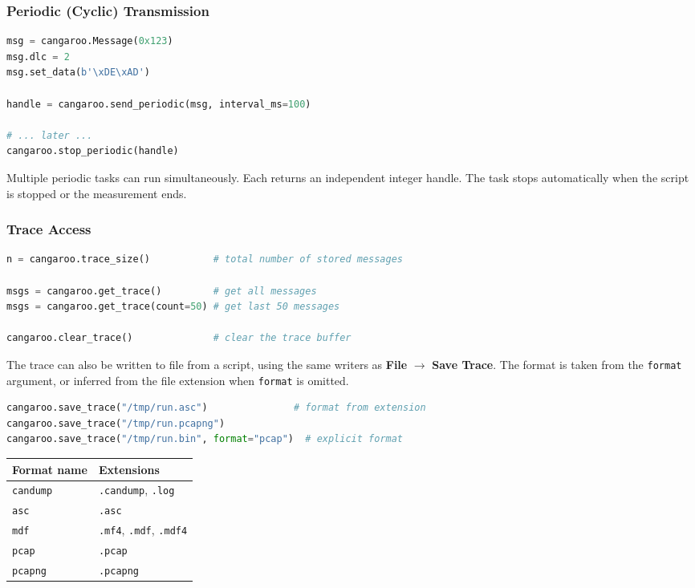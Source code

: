 \documentclass[a4paper,11pt]{article}
\newcommand{\ui}[1]{\textbf{#1}}
\newcommand{\file}[1]{\texttt{#1}}
\begin{document}
\subsubsection{Periodic (Cyclic) Transmission}

\begin{lstlisting}[language=Python, caption={Send a heartbeat every 100 ms}]
msg = cangaroo.Message(0x123)
msg.dlc = 2
msg.set_data(b'\xDE\xAD')

handle = cangaroo.send_periodic(msg, interval_ms=100)

# ... later ...
cangaroo.stop_periodic(handle)
\end{lstlisting}

Multiple periodic tasks can run simultaneously. Each returns an independent
integer handle. The task stops automatically when the script is stopped or the
measurement ends.

\subsubsection{Trace Access}

\begin{lstlisting}[language=Python, caption={Read from the captured trace}]
n = cangaroo.trace_size()           # total number of stored messages

msgs = cangaroo.get_trace()         # get all messages
msgs = cangaroo.get_trace(count=50) # get last 50 messages

cangaroo.clear_trace()              # clear the trace buffer
\end{lstlisting}

The trace can also be written to file from a script, using the same writers as
\ui{File} $\rightarrow$ \ui{Save Trace}. The format is taken from the
\file{format} argument, or inferred from the file extension when \file{format}
is omitted.

\begin{lstlisting}[language=Python, caption={Save the trace to a file}]
cangaroo.save_trace("/tmp/run.asc")               # format from extension
cangaroo.save_trace("/tmp/run.pcapng")
cangaroo.save_trace("/tmp/run.bin", format="pcap")  # explicit format
\end{lstlisting}

\begin{tabular}{ll}
  \textbf{Format name} & \textbf{Extensions} \\
  \hline
  \file{candump} & \file{.candump}, \file{.log} \\
  \file{asc}     & \file{.asc} \\
  \file{mdf}     & \file{.mf4}, \file{.mdf}, \file{.mdf4} \\
  \file{pcap}    & \file{.pcap} \\
  \file{pcapng}  & \file{.pcapng} \\
\end{tabular}
\end{document}
